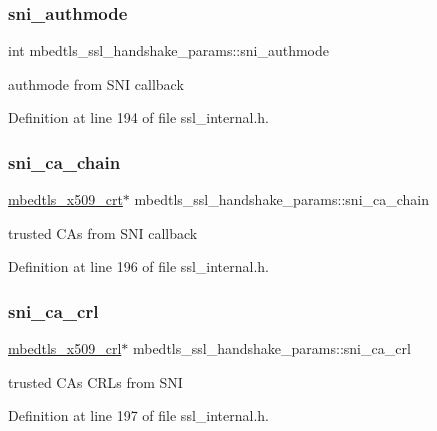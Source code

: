 \subsubsection{\texorpdfstring{sni\+\_\+authmode}{sni\_authmode}}
{\footnotesize\ttfamily int mbedtls\+\_\+ssl\+\_\+handshake\+\_\+params\+::sni\+\_\+authmode}

authmode from S\+NI callback 

Definition at line 194 of file ssl\+\_\+internal.\+h.

\mbox{\label{structmbedtls__ssl__handshake__params_a4d18e84d136e133fe5edfff81a207168}} 
\subsubsection{\texorpdfstring{sni\+\_\+ca\+\_\+chain}{sni\_ca\_chain}}
{\footnotesize\ttfamily \mbox{\hyperlink{structmbedtls__x509__crt}{mbedtls\+\_\+x509\+\_\+crt}}$\ast$ mbedtls\+\_\+ssl\+\_\+handshake\+\_\+params\+::sni\+\_\+ca\+\_\+chain}

trusted C\+As from S\+NI callback 

Definition at line 196 of file ssl\+\_\+internal.\+h.

\mbox{\label{structmbedtls__ssl__handshake__params_ae2b1df99f674ec78b072234a0bb4fa40}} 
\subsubsection{\texorpdfstring{sni\+\_\+ca\+\_\+crl}{sni\_ca\_crl}}
{\footnotesize\ttfamily \mbox{\hyperlink{structmbedtls__x509__crl}{mbedtls\+\_\+x509\+\_\+crl}}$\ast$ mbedtls\+\_\+ssl\+\_\+handshake\+\_\+params\+::sni\+\_\+ca\+\_\+crl}

trusted C\+As C\+R\+Ls from S\+NI 

Definition at line 197 of file ssl\+\_\+internal.\+h.

